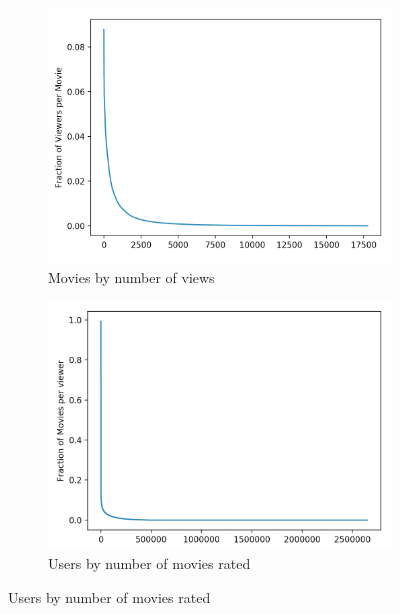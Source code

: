 \documentclass{article} %
\begin{document}
\begin{figure}[htb]
\centering
\begin{subfigure}{.5\textwidth}
  \centering
  \includegraphics[width=.9\linewidth]{movies_by_views}
  \caption{Movies by number of views}
  \label{fig:sub1}
\end{subfigure}%
\begin{subfigure}{.5\textwidth}
  \centering
  \includegraphics[width=.9\linewidth]{users_by_ratings}
  \caption{Users by number of movies rated}
  \label{fig:sub2}
\end{subfigure}
\end{figure}
\end{document}
